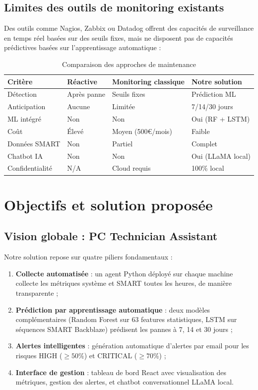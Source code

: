 \subsection{Limites des outils de monitoring existants}

Des outils comme Nagios, Zabbix ou Datadog offrent des capacités de surveillance en temps
réel basées sur des seuils fixes, mais ne disposent pas de capacités prédictives basées
sur l'apprentissage automatique :

\begin{table}[H]
\centering
\caption{Comparaison des approches de maintenance}
\begin{tabularx}{\textwidth}{|l|X|X|X|}
\hline
\rowcolor{lightblue}
\textbf{Critère} & \textbf{Réactive} & \textbf{Monitoring classique} & \textbf{Notre solution} \\
\hline
Détection & Après panne & Seuils fixes & Prédiction ML \\
\hline
Anticipation & Aucune & Limitée & 7/14/30 jours \\
\hline
ML intégré & Non & Non & Oui (RF + LSTM) \\
\hline
Coût & Élevé & Moyen (500€/mois) & Faible \\
\hline
Données SMART & Non & Partiel & Complet \\
\hline
Chatbot IA & Non & Non & Oui (LLaMA local) \\
\hline
Confidentialité & N/A & Cloud requis & 100\% local \\
\hline
\end{tabularx}
\end{table}

\section{Objectifs et solution proposée}

\subsection{Vision globale : PC Technician Assistant}

Notre solution repose sur quatre piliers fondamentaux :

\begin{enumerate}
  \item \textbf{Collecte automatisée} : un agent Python déployé sur chaque machine collecte
        les métriques système et SMART toutes les heures, de manière transparente ;
  \item \textbf{Prédiction par apprentissage automatique} : deux modèles complémentaires
        (Random Forest sur 63 features statistiques, LSTM sur séquences SMART Backblaze)
        prédisent les pannes à 7, 14 et 30 jours ;
  \item \textbf{Alertes intelligentes} : génération automatique d'alertes par email pour
        les risques HIGH ($\geq 50\%$) et CRITICAL ($\geq 70\%$) ;
  \item \textbf{Interface de gestion} : tableau de bord React avec visualisation des
        métriques, gestion des alertes, et chatbot conversationnel LLaMA local.
\end{enumerate}

